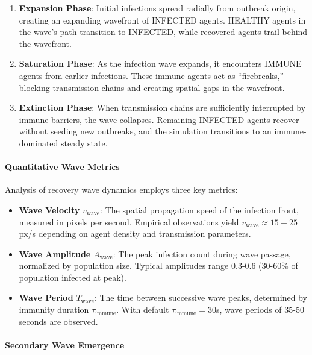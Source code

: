 \begin{enumerate}
    \item \textbf{Expansion Phase}: Initial infections spread radially from outbreak origin, creating an expanding wavefront of INFECTED agents. HEALTHY agents in the wave's path transition to INFECTED, while recovered agents trail behind the wavefront.
    
    \item \textbf{Saturation Phase}: As the infection wave expands, it encounters IMMUNE agents from earlier infections. These immune agents act as ``firebreaks,'' blocking transmission chains and creating spatial gaps in the wavefront.
    
    \item \textbf{Extinction Phase}: When transmission chains are sufficiently interrupted by immune barriers, the wave collapses. Remaining INFECTED agents recover without seeding new outbreaks, and the simulation transitions to an immune-dominated steady state.
\end{enumerate}

\paragraph{Quantitative Wave Metrics}

Analysis of recovery wave dynamics employs three key metrics:

\begin{itemize}
    \item \textbf{Wave Velocity} $v_{\text{wave}}$: The spatial propagation speed of the infection front, measured in pixels per second. Empirical observations yield $v_{\text{wave}} \approx 15-25$ px/s depending on agent density and transmission parameters.
    
    \item \textbf{Wave Amplitude} $A_{\text{wave}}$: The peak infection count during wave passage, normalized by population size. Typical amplitudes range 0.3-0.6 (30-60\% of population infected at peak).
    
    \item \textbf{Wave Period} $T_{\text{wave}}$: The time between successive wave peaks, determined by immunity duration $\tau_{\text{immune}}$. With default $\tau_{\text{immune}} = 30$s, wave periods of 35-50 seconds are observed.
\end{itemize}

\paragraph{Secondary Wave Emergence}

